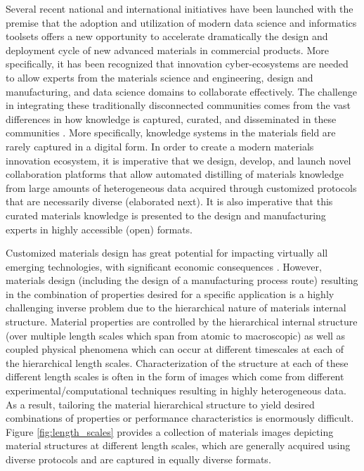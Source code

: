 \documentclass{bmcart}
\begin{document}
Several recent national and international initiatives \cite{anderson2011report, MGIwhite, MGI2014} have been launched with the premise that the adoption and utilization of modern data science and informatics toolsets offers a new opportunity to accelerate dramatically the design and deployment cycle of new advanced materials in commercial products. More specifically, it has been recognized that innovation cyber-ecosystems \cite{mcdowell2016materials} are needed to allow experts from the materials science and engineering, design and manufacturing, and data science domains to collaborate effectively. The challenge in integrating these traditionally disconnected communities comes from the vast differences in how knowledge is captured, curated, and disseminated in these communities \cite{kalidindi2015data}. More specifically, knowledge systems in the materials field are rarely captured in a digital form. In order to create a modern materials innovation ecosystem, it is imperative that we design, develop, and launch novel collaboration platforms that allow automated distilling of materials knowledge from large amounts of heterogeneous data acquired through customized protocols that are necessarily diverse (elaborated next). It is also imperative that this curated materials knowledge is presented to the design and manufacturing experts in highly accessible (open) formats.

Customized materials design has great potential for impacting virtually all emerging technologies, with significant economic consequences \cite{ward2012materials, allison2006integrated, MGIwhite, MGI2014, allison2011integrated, olson2000designing, national2008integrated, schmitz2012integrative, robinson2013tms, allisonintegrated, TMSfieldstudy}. However, materials design (including the design of a manufacturing process route) resulting in the combination of properties desired for a specific application is a highly challenging inverse problem due to the hierarchical nature of materials internal structure. Material properties are controlled by the hierarchical internal structure (over multiple length scales which span from atomic to macroscopic) as well as coupled physical phenomena which can occur at different timescales at each of the hierarchical length scales. Characterization of the structure at each of these different length scales is often in the form of images which come from different experimental/computational techniques resulting in highly heterogeneous data. As a result, tailoring the material hierarchical structure to yield desired combinations of properties or performance characteristics is enormously difficult. Figure \ref{fig:length_scales} provides a collection of materials images depicting material structures at different length scales, which are generally acquired using diverse protocols and are captured in equally diverse formats.
\end{document}
